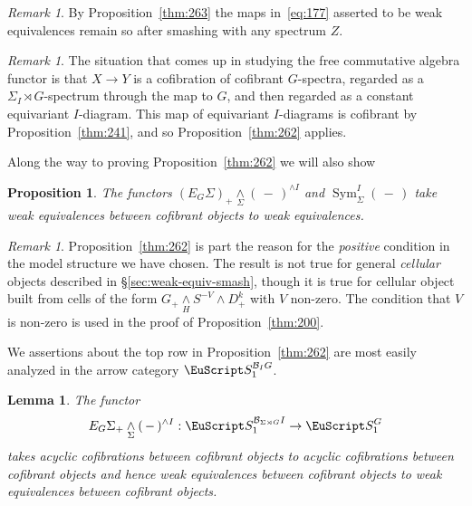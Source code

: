 \documentclass{amsart}
\newtheorem{lem}[equation]{Lemma}
\newtheorem{prop}[equation]{Proposition}
\newtheorem{rem}[equation]{Remark}
\theoremstyle{definition}
\theoremstyle{remark}
\newtheorem{rem}[equation]{Remark}
\newcommand{\slot}{\,-\,}
\DeclareMathOperator{\sym}{Sym}
\newcommand{\spectra}{\EuScript S}
\newcommand{\smashove}[1]{\underset{#1}{\wedge}}
\newcommand{\cat}[1]{{\mathcal #1}}
\newcommand{\eggroup}[2]{E_{#1}#2}
\newcommand{\egsigma}[1]{\eggroup{#1}{\Sigma}}
\newcommand{\augspectra}[1]{\spectra_{1}^{#1}}
\newcommand{\aspectra}[1]{\spectra_{1}^{#1}}
\begin{document}
\begin{rem}
\label{rem:32}
By Proposition~\ref{thm:263} the maps in~\eqref{eq:177} asserted to be
weak equivalences remain so after smashing with any spectrum $Z$.
\end{rem}

\begin{rem}
\label{rem:72} The situation that comes up in studying the free
commutative algebra functor is that $X\to Y$ is a cofibration of
cofibrant $G$-spectra, regarded as a $\Sigma_{I}\rtimes G$-spectrum
through the map to $G$, and then regarded as a constant equivariant
$I$-diagram.  This map of equivariant $I$-diagrams is cofibrant by
Proposition~\ref{thm:241}, and so Proposition~\ref{thm:262} applies.
\end{rem}


Along the way to proving Proposition~\ref{thm:262} we will also show

\begin{prop}
\label{thm:198} 
The functors $(\egsigma{G})_{+}\smashove{\Sigma}(\slot)^{\wedge I}$
and  $\sym^{I}_{\Sigma}(\slot)$ take weak equivalences between
cofibrant objects to weak equivalences.
\end{prop}

\begin{rem}
\label{rem:65} 
Proposition~\ref{thm:262} is part the reason for the
{\em positive} condition in the model structure we have chosen.  The
result is not true for general {\em cellular} objects described in
\S\ref{sec:weak-equiv-smash}, though it is true for cellular object
built from cells of the form $G_{+}\smashove{H}S^{-V}\wedge D^{k}_{+}$
with $V$ non-zero.  The condition that $V$ is non-zero is used in the
proof of Proposition~\ref{thm:200}.
\end{rem}

We assertions about the top row in Proposition~\ref{thm:262} are most
easily analyzed in the arrow category $\aspectra{\cat B_{I}G}$.  

\begin{lem}
\label{thm:201} The functor
\[
\egsigma{G}_{+}\underset{\Sigma}{\wedge}(\slot)^{\wedge
I}:\augspectra{\cat{B}_{\Sigma\rtimes G}I}\to\augspectra{G}
\]
takes acyclic cofibrations between cofibrant objects to acyclic
cofibrations between cofibrant objects and hence 
weak equivalences between cofibrant objects to weak equivalences
between cofibrant objects.
\end{lem}
\end{document}
